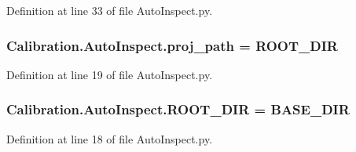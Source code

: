 Definition at line 33 of file Auto\+Inspect.\+py.

\hypertarget{namespace_calibration_1_1_auto_inspect_a5d5e7eb538493d988b4df04bf7f01f17}{}
\subsubsection[{proj\+\_\+path}]{\setlength{\rightskip}{0pt plus 5cm}Calibration.\+Auto\+Inspect.\+proj\+\_\+path = {\bf R\+O\+O\+T\+\_\+\+D\+I\+R}}\label{namespace_calibration_1_1_auto_inspect_a5d5e7eb538493d988b4df04bf7f01f17}


Definition at line 19 of file Auto\+Inspect.\+py.

\hypertarget{namespace_calibration_1_1_auto_inspect_a371c32fa376ba0742bdfde31c73d9317}{}
\subsubsection[{R\+O\+O\+T\+\_\+\+D\+I\+R}]{\setlength{\rightskip}{0pt plus 5cm}Calibration.\+Auto\+Inspect.\+R\+O\+O\+T\+\_\+\+D\+I\+R = B\+A\+S\+E\+\_\+\+D\+I\+R}\label{namespace_calibration_1_1_auto_inspect_a371c32fa376ba0742bdfde31c73d9317}


Definition at line 18 of file Auto\+Inspect.\+py.

